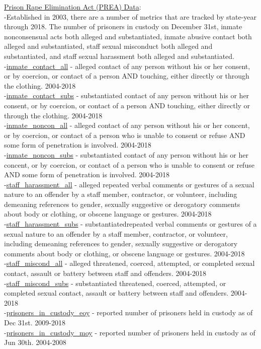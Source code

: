 \documentclass[10pt,a4paper]{article}
\begin{document}
\underline{Prison Rape Elimination Act (PREA) Data}: \\
-Established in 2003, there are a number of metrics that are tracked by state-year through 2018. The number of prisoners in custody on December 31st, inmate nonconsensual acts both alleged and substantiated, inmate abusive contact both alleged and substantiated, staff sexual misconduct both alleged and substantiated, and staff sexual harassment both alleged and substantiated. \\
-\underline{inmate\_contact\_all} - alleged contact of any person without his or her consent, or by coercion, or contact of a person AND touching, either directly or through the clothing. 2004-2018 \\
-\underline{inmate\_contact\_subs} - substantiated contact of any person without his or her consent, or by coercion, or contact of a person AND touching, either directly or through the clothing. 2004-2018 \\
-\underline{inmate\_noncon\_all} - alleged contact of any person without his or her concent, or by coercion, or contact of a person who is unable to consent or refuse AND some form of penetration is involved. 2004-2018 \\
-\underline{inmate\_noncon\_subs} - substantiated contact of any person without his or her concent, or by coercion, or contact of a person who is unable to consent or refuse AND some form of penetration is involved. 2004-2018 \\
-\underline{staff\_harassment\_all} - alleged repeated verbal comments or gestures of a sexual nature to an offender by a staff member, contractor, or volunteer, including demeaning references to gender, sexually suggestive or derogatory comments about body or clothing, or obscene language or gestures. 2004-2018 \\
-\underline{staff\_harassment\_subs} - substantiatedrepeated verbal comments or gestures of a sexual nature to an offender by a staff member, contractor, or volunteer, including demeaning references to gender, sexually suggestive or derogatory comments about body or clothing, or obscene language or gestures. 2004-2018 \\
-\underline{staff\_miscond\_all} - alleged threatened, coerced, attempted, or completed sexual contact, assault or battery between staff and offenders. 2004-2018 \\
-\underline{staff\_miscond\_subs} - substantiated threatened, coerced, attempted, or completed sexual contact, assault or battery between staff and offenders. 2004-2018 \\
-\underline{prisoners\_in\_custody\_eoy} - reported number of prisoners held in custody as of Dec 31st. 2009-2018 \\
-\underline{prisoners\_in\_custody\_moy} - reported number of prisoners held in custody as of Jun 30th. 2004-2008 \\
\\
\end{document}
